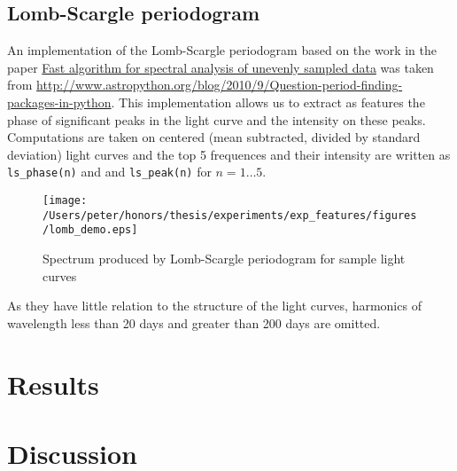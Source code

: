	\subsection{Lomb-Scargle periodogram}
	An implementation of the Lomb-Scargle periodogram based on the work in the paper \href{http://adsabs.harvard.edu/abs/1989ApJ...338..277P}{Fast algorithm for spectral analysis of unevenly sampled data} was taken from \url{http://www.astropython.org/blog/2010/9/Question-period-finding-packages-in-python}. This implementation allows us to extract as features the phase of significant peaks in the light curve and the intensity on these peaks. Computations are taken on centered (mean subtracted, divided by standard deviation) light curves and the top 5 frequences and their intensity are written as \verb#ls_phase(n)# and and \verb#ls_peak(n)# for $n = 1\ldots 5$. \\ %
	\begin{figure}[ht!]
		\label{fig:lsspectrum}
		\texttt{[image: /Users/peter/honors/thesis/experiments/exp\_features/figures/lomb\_demo.eps]}
		\caption{Spectrum produced by Lomb-Scargle periodogram for sample light curves}
	\end{figure}
	
	As they have little relation to the structure of the light curves, harmonics of wavelength less than 20 days and greater than 200 days are omitted.
	
	\section{Results}
	
	\section{Discussion}

